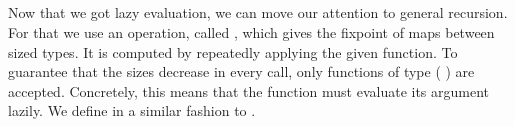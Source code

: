 \begin{code}%
\>[0]\AgdaSpace{}%
\AgdaSymbol{:}\AgdaSpace{}%
\AgdaSymbol{\{}\AgdaSpace{}%
\AgdaSymbol{:}\AgdaSpace{}%
\AgdaSymbol{\}}\AgdaSpace{}%
\AgdaSpace{}%
\AgdaFunction{\&}\AgdaSpace{}%
\AgdaSpace{}%
\AgdaSpace{}%
\AgdaFunction{\&}\AgdaSymbol{(}\AgdaSpace{}%
\AgdaSymbol{)}\<%
\\
\>[0]\AgdaSpace{}%
\AgdaSymbol{(}\AgdaSpace{}%
\AgdaSymbol{)}\AgdaSpace{}%
\AgdaSymbol{=}\AgdaSpace{}%
\<%
\\
%
\\[\AgdaEmptyExtraSkip]%
\>[0]\AgdaSpace{}%
\AgdaSymbol{:}\AgdaSpace{}%
\AgdaSymbol{\{}\AgdaSpace{}%
\AgdaSymbol{:}\AgdaSpace{}%
\AgdaSymbol{\}}\AgdaSpace{}%
\AgdaSymbol{\{}\AgdaSpace{}%
\AgdaSymbol{:}\AgdaSpace{}%
\AgdaSymbol{\}}\AgdaSpace{}%
\AgdaSpace{}%
\AgdaFunction{\&}\AgdaSymbol{(}\AgdaSymbol{(}\AgdaSpace{}%
\AgdaSpace{}%
\AgdaSymbol{)}\AgdaSpace{}%
\AgdaSpace{}%
\AgdaSpace{}%
\AgdaSpace{}%
\AgdaSpace{}%
\AgdaSpace{}%
\AgdaSymbol{)}\<%
\\
\>[0]\AgdaSpace{}%
\AgdaSymbol{(}\AgdaSpace{}%
\AgdaSpace{}%
\AgdaSymbol{)}\AgdaSpace{}%
\AgdaSymbol{=}\AgdaSpace{}%
\AgdaSpace{}%
\AgdaSpace{}%
\AgdaSymbol{(}\AgdaSpace{}%
\AgdaSymbol{)}\<%
\end{code}

Now that we got lazy evaluation, we can move our attention to general recursion.
For that we use an operation, called , which gives the fixpoint of maps between sized types.
It is computed by repeatedly applying the given function.
To guarantee that the sizes decrease in every call, only functions of type \AF{\&}(   ) are accepted.
Concretely, this means that the function must evaluate its argument lazily.
We define  in a similar fashion to .

